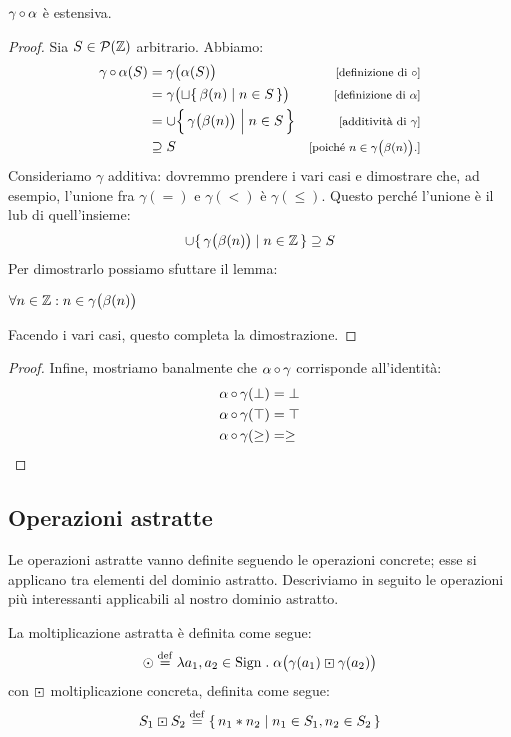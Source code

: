 \begin{proposizione}
$\mathrm{\gamma}\mathop{\circ}\mathrm{\alpha}$ è estensiva.
\end{proposizione}
\begin{proof}
Sia $S \in \mathcal{P}(\mathbb{Z})$ arbitrario.
Abbiamo:
\begin{align*}
  \compfun{\gamma}{\alpha}(S)
    &= \gamma\bigl(\alpha(S)\bigr)
         &\law{definizione di $\circ$} \\
    &= \gamma\bigl(\sqcup \{\, \beta(n) \mid n \in S \,\} \bigr)
         &\law{definizione di $\alpha$} \\
    &= \union \Bigl\{\, \gamma\bigl(\beta(n)\bigr) \Bigm| n \in S \,\Bigr\}
         &\law{additività di $\gamma$} \\
    &\supseteq S
         &\law{poiché $n \in \gamma\bigl(\beta(n)\bigr)$.}
\end{align*}
Consideriamo $\gamma$ additiva: dovremmo prendere i vari casi e
dimostrare che, ad esempio, l'unione fra
$\gamma(=)$ e $\gamma(<)$ è $\gamma(\leq)$.
Questo perché l'unione è il lub di quell'insieme:
\[
        \cup \{\, \gamma\bigl(\beta(n)\bigr) \mid n \in \mathbb{Z} \,\} \supseteq S
\]
Per dimostrarlo possiamo sfuttare il lemma:
\begin{lemma}
        $ \forall n \in \mathbb{Z} \mathrel{:} n \in \gamma\bigl(\beta(n)\bigr) $
\end{lemma}
Facendo i vari casi, questo completa la dimostrazione.
\end{proof}

\begin{proof}
Infine, mostriamo banalmente che $\mathrm{\alpha}\mathop{\circ}\mathrm{\gamma}$ corrisponde all'identità:
\begin{align*}
        \mathrm{\alpha}\mathop{\circ}\mathrm{\gamma}(\bot) &= \bot \\
        \mathrm{\alpha}\mathop{\circ}\mathrm{\gamma}(\top) &= \top \\
        \mathrm{\alpha}\mathop{\circ}\mathrm{\gamma}(\geq) &= \geq
\end{align*}
\end{proof}

\subsection{Operazioni astratte}
Le operazioni astratte vanno definite seguendo le operazioni concrete;
esse si applicano tra elementi del dominio astratto.
Descriviamo in seguito le operazioni più interessanti applicabili
al nostro dominio astratto.

\begin{definizione}
La moltiplicazione astratta è definita come segue:
\[
        \absmul \defeq \lambda a_1,a_2 \in \Sign \st \alpha\bigl(\gamma(a_1) \conmul \gamma(a_2)\bigr)
\]
con $\mathbin{\boxdot}$ moltiplicazione concreta, definita come segue:
\[
        S_1 \conmul S_2 \defeq \{\, n_1 * n_2 \mid n_1 \in S_1, n_2 \in S_2 \,\}
\]
\end{definizione}

